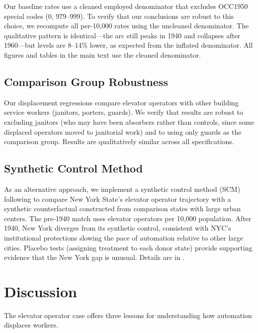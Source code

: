 \documentclass[12pt]{article}
\begin{document}
Our baseline rates use a cleaned employed denominator that excludes OCC1950 special codes (0, 979--999). To verify that our conclusions are robust to this choice, we recompute all per-10,000 rates using the uncleaned denominator. The qualitative pattern is identical---the arc still peaks in 1940 and collapses after 1960---but levels are 8--14\% lower, as expected from the inflated denominator. All figures and tables in the main text use the cleaned denominator.

\subsection{Comparison Group Robustness}

Our displacement regressions compare elevator operators with other building service workers (janitors, porters, guards). We verify that results are robust to excluding janitors (who may have been absorbers rather than controls, since some displaced operators moved to janitorial work) and to using only guards as the comparison group. Results are qualitatively similar across all specifications.

\subsection{Synthetic Control Method}

As an alternative approach, we implement a synthetic control method (SCM) following \citet{abadie2010} to compare New York State's elevator operator trajectory with a synthetic counterfactual constructed from comparison states with large urban centers. The pre-1940 match uses elevator operators per 10,000 population. After 1940, New York diverges from its synthetic control, consistent with NYC's institutional protections slowing the pace of automation relative to other large cities. Placebo tests (assigning treatment to each donor state) provide supporting evidence that the New York gap is unusual. Details are in .



\section{Discussion} \label{sec:discussion}

The elevator operator case offers three lessons for understanding how automation displaces workers.
\end{document}
